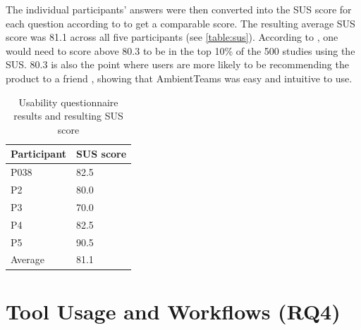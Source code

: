 The individual participants' answers were then converted into the SUS score for each question according to \textcite{sauroSUS} to get a comparable score. The resulting average SUS score was 81.1 across all five participants (see \autoref{table:sus}). According to \textcite{sauroSUS}, one would need to score above 80.3 to be in the top 10\% of the 500 studies using the SUS. 80.3 is also the point where users are more likely to be recommending the product to a friend \autocite{sauroSUS}, showing that AmbientTeams was easy and intuitive to use.

\begin{table}[h] \footnotesize
    \centering
    \begin{tabularx}{.35\textwidth}{X X}
        \toprule
        Participant & SUS score \\
        \midrule
        P038        & 82.5      \\
        P2          & 80.0      \\
        P3          & 70.0      \\
        P4          & 82.5      \\
        P5          & 90.5      \\
        \midrule
        Average     & 81.1      \\
        \bottomrule
    \end{tabularx}
    \caption{Usability questionnaire results and resulting SUS score}
    \label{table:sus}
\end{table}

\section{Tool Usage and Workflows (RQ4)}
\label{section:tool_usage_and_workflows}

